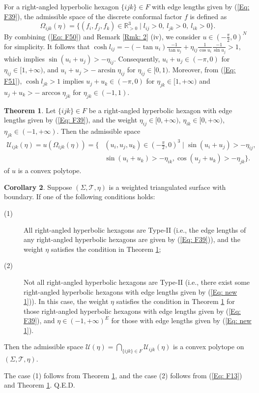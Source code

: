 \documentclass[12pt]{amsart}
\theoremstyle{definition}
\newtheorem{theorem}{Theorem}[section]
\newtheorem{corollary}[theorem]{Corollary}
\def\qed{\hfill{Q.E.D.}\smallskip}
\begin{document}
For a right-angled hyperbolic hexagon $\{ijk\}\in F$ with edge lengths given by (\ref{Eq: F39}), 
the admissible space of the discrete conformal factor $f$ is defined as
\begin{equation*}
\Omega_{ijk}(\eta)=\{(f_i,f_j,f_k)\in \mathbb{R}_{>0}^3 \mid l_{ij}>0,\  l_{jk}>0,\ l_{ik}>0\}.
\end{equation*}
By combining (\ref{Eq: F50}) and Remark \ref{Rmk: 2} (iv), 
we consider $u\in (-\frac{\pi}{2},0)^N$ for simplicity.
It follows that
$\cosh l_{ij}=-(-\tan u_i)\frac{-1}{\tan u_j}+\eta_{ij}\frac{1}{\cos u_i}\frac{-1}{\sin u_j}>1$,
which implies $\sin(u_i+u_j)>-\eta_{ij}$.
Consequently, $u_i+u_j\in (-\pi,0)$ for $\eta_{ij}\in [1,+\infty)$, and $u_i+u_j>-\arcsin \eta_{ij}$ for $\eta_{ij}\in [0, 1)$.
Moreover, from (\ref{Eq: F51}),
$\cosh l_{jk}>1$ implies $u_j+u_k\in (-\pi,0)$ for $\eta_{jk}\in [1,+\infty)$ and
$u_j+u_k>-\arccos \eta_{jk}$ for $\eta_{jk}\in (-1,1)$.


\begin{theorem}\label{Thm: ASC new}
Let $\{ijk\}\in F$ be a right-angled hyperbolic  hexagon with edge lengths given by (\ref{Eq: F39}),
and the weight $\eta_{ij}\in [0,+\infty)$, $\eta_{ik}\in [0,+\infty)$, $\eta_{jk}\in (-1,+\infty)$.
Then the admissible space
\begin{equation*}
\begin{aligned}
\mathcal{U}_{ijk}(\eta)=u(\Omega_{ijk}(\eta))
=\{&(u_i,u_j,u_k)\in (-\frac{\pi}{2},0)^3 \mid \sin(u_i+u_j)>-\eta_{ij}, \\
&\sin(u_i+u_k)>-\eta_{ik},
\cos(u_j+u_k)>-\eta_{jk}\}.
\end{aligned}
\end{equation*}
of $u$ is a convex polytope.
\end{theorem}

\begin{corollary}\label{Cor: ASC new}
Suppose $(\Sigma,\mathcal{T},\eta)$ is a weighted triangulated surface with boundary.
If one of the following conditions holds: 
\begin{description}
\item[(1)]
All right-angled hyperbolic hexagons are Type-II (i.e., the edge lengths of any right-angled hyperbolic hexagons are given by (\ref{Eq: F39})),
and the weight $\eta$ satisfies the condition in Theorem \ref{Thm: ASC new};
\item[(2)]
Not all right-angled hyperbolic hexagons are Type-II (i.e., there exist some right-angled hyperbolic hexagons with edge lengths given by (\ref{Eq: new 1})).
In this case, the weight $\eta$ satisfies the condition in Theorem \ref{Thm: ASC new} for those right-angled hyperbolic hexagons with edge lengths given by (\ref{Eq: F39}),
and $\eta\in (-1,+\infty)^E$ for those with edge lengths given by (\ref{Eq: new 1}).
\end{description}
Then the admissible space
$\mathcal{U}(\eta)=\bigcap_{\{ijk\}\in F}\mathcal{U}_{ijk}(\eta)$ is a convex polytope on $(\Sigma,\mathcal{T},\eta)$.
\end{corollary}
\proof
The case (1) follows from Theorem \ref{Thm: ASC new}, and the case (2) follows from (\ref{Eq: F13}) and Theorem \ref{Thm: ASC new}.
\qed
\end{document}
